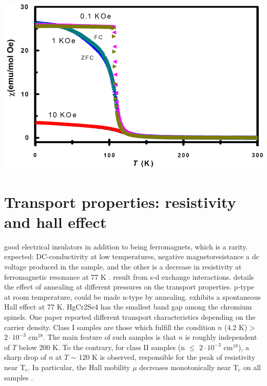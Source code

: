 \documentclass[preprint,pre,floats,aps,amsmath,amssymb]{revtex4}
\begin{document}
\begin{minipage}{.59\linewidth}
\includegraphics[width=1.1\linewidth]{suscvstemp.png}
\centering{}
\end{minipage}



\section{Transport properties: resistivity and hall effect}

good electrical insulators in addition to being ferromagnets, which is a rarity.
expected: DC-conductivity at low temperatures, negative magnetoresistance
 a dc voltage produced in the sample, and the other is a decrease in resistivity at ferromagnetic resonance at 77 K \cite{toda}. result from s-d exchange interactions.
 \cite{goldstein} details the effect of annealing at different pressures on the transport properties. p-type at room temperature, could be made n-type by annealing. exhibits a spontaneous Hall effect at 77 K. HgCr2Se4 has the smallest band gap among the chromium spinels. One paper \cite{selmi} reported different transport characteristics depending on the carrier density. Class I samples are those which fulfill the condition $n$ (4.2 K) \textgreater~$2\cdot10^{-3}$ cm$^{18}$. The main feature of such samples is that $n$ is roughly independent of $T$ below 200 K. To the contrary, for class II samples (n $\le$ $2\cdot10^{-3}$ cm$^{18}$), a sharp drop of $n$ at $T$ $\sim$ 120 K is observed, responsible for the peak of resistivity near T$_c$. In particular, the Hall mobility $\mu$ decreases monotonically near T$_c$ on all samples .
\end{document}
